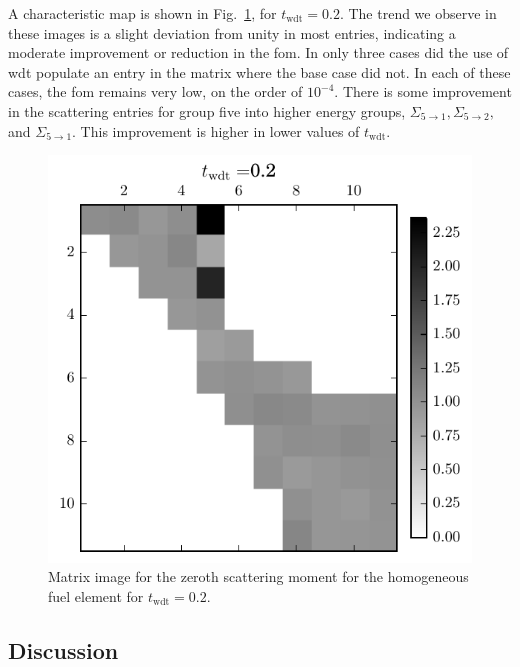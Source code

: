 A characteristic map is shown in Fig.~\ref{fig:homog_inf_sp0_map}, for
$t_{\mathrm{wdt}} = 0.2$. The trend we observe in these images is a
slight deviation from unity in most entries, indicating a moderate
improvement or reduction in the \gls{fom}. In only three cases did the
use of \gls{wdt} populate an entry in the matrix where the base case
did not. In each of these cases, the \gls{fom} remains very low, on
the order of $10^{-4}$. There is some improvement in the scattering
entries for group five into higher energy groups,
$\Sigma_{5 \to 1}, \Sigma_{5 \to 2},$ and $\Sigma_{5 \to 1}$. This
improvement is higher in lower values of $t_{\mathrm{wdt}}$.
\begin{figure}[hbtp]
  \centering
    \includegraphics[scale=0.75]{images/results/matshows/homog_sp0_matshow_1}
  \caption{Matrix image for the zeroth scattering moment for the
    homogeneous fuel element for $t_{\mathrm{wdt}} = 0.2$.}
  \label{fig:homog_inf_sp0_map}
\end{figure}
\newpage
\subsection{Discussion}
\label{sec:homog_discussion}

